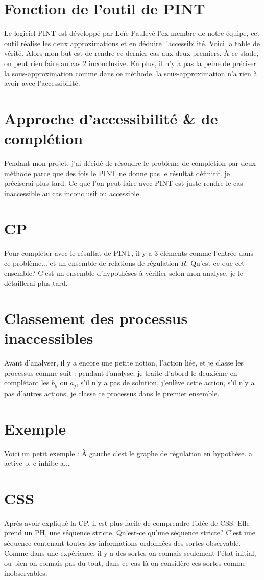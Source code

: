 \documentclass[french,12pt]{article}
\begin{document}
\section{Fonction de l'outil de PINT}
Le logiciel PINT est développé par Loïc Paulevé l'ex-membre de notre équipe, cet outil réalise les deux approximations et en déduire l'accessibilité. Voici la table de vérité. Alors mon but est de rendre ce dernier cas aux deux premiers. À ce stade, on peut rien faire au cas 2 inconclusive. En plus, il n'y a pas la peine de préciser la sous-approximation comme dans ce méthode, la sous-approximation n'a rien à avoir avec l'accessibilité. 
\section{Approche d'accessibilité \& de complétion}
Pendant mon projet, j'ai décidé de résoudre le problème de complétion par deux méthode parce que des fois le PINT ne donne pas le résultat définitif. je préciserai plus tard. Ce que l'on peut faire avec PINT est juste rendre le cas inaccessible au cas inconclusif ou accessible.
\section{CP}
Pour compléter avec le résultat de PINT, il y a 3 éléments comme l'entrée dans ce problème... et un ensemble de relations de régulation $R$. Qu'est-ce que cet ensemble? C'est un ensemble d'hypothèses à vérifier selon mon analyse. je le détaillerai plus tard.
\section{Classement des processus inaccessibles}
Avant d'analyser, il y a encore une petite notion, l'action liée, et je classe les processus comme suit : pendant l'analyse, je traite d'abord le deuxième en complétant les $b_k$ ou $a_j$, s'il n'y a pas de solution, j'enlève cette action, s'il n'y a pas d'autres actions, je classe ce processus dans le premier ensemble.
\section{Exemple}
Voici un petit exemple : À gauche c'est le graphe de régulation en hypothèse. a active b, c inhibe a...
\section{CSS}
Après avoir expliqué la CP, il est plus facile de comprendre l'idée de CSS. Elle prend un PH, une séquence stricte. Qu'est-ce qu'une séquence stricte? C'est une séquence contenant toutes les informations ordonnées des sortes observable. Comme dans une expérience, il y a des sortes on connais seulement l'état initial, ou bien on connais pas du tout, dans ce cas là on considère ces sortes comme inobservables.
\end{document}
